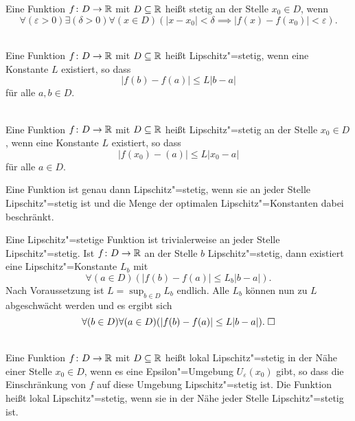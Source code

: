 \begin{Definition}\label{cont}
Eine Funktion $f\colon D\to\mathbb R$ mit $D\subseteq\mathbb R$ heißt stetig an der
Stelle $x_0\in D$, wenn
\[\forall(\varepsilon>0)\exists(\delta>0)\forall(x\in D)(
  |x-x_0|<\delta\implies |f(x)-f(x_0)|<\varepsilon).\]
\end{Definition}

\begin{Definition}\mbox{}\\
Eine Funktion $f\colon D\to\mathbb R$ mit $D\subseteq\mathbb R$ heißt
Lipschitz"=stetig, wenn eine Konstante $L$ existiert, so dass
\[|f(b)-f(a)|\le L|b-a|\]
für alle $a,b\in D$.
\end{Definition}

\begin{Definition}%
\label{Lipschitz-cont-at}\mbox{}\\
Eine Funktion $f\colon D\to\mathbb R$ mit $D\subseteq\mathbb R$ heißt
Lipschitz"=stetig an der Stelle $x_0\in D$, wenn eine Konstante $L$
existiert, so dass
\[|f(x_0)-(a)|\le L|x_0-a|\]
für alle $a\in D$.
\end{Definition}

\begin{Korollar}
Eine Funktion ist genau dann Lipschitz"=stetig, wenn sie an jeder
Stelle Lipschitz"=stetig ist und die Menge der optimalen
Lipschitz"=Konstanten dabei beschränkt.
\end{Korollar}
\begin{Beweis}
Eine Lipschitz"=stetige Funktion ist trivialerweise an jeder Stelle
Lipschitz"=stetig. Ist $f\colon D\to\mathbb R$ an der Stelle $b$ Lipschitz"=stetig,
dann existiert eine Lipschitz"=Konstante $L_b$ mit%
\[\forall(a\in D)(|f(b)-f(a)|\le L_b |b-a|).\]
Nach Voraussetzung ist $L=\sup_{b\in D} L_b$ endlich. Alle $L_b$ können
nun zu $L$ abgeschwächt werden und es ergibt sich%
\[\forall(b\in D)\forall(a\in D)(|f(b)-f(a)|\le L|b-a|).\;\square\]
\end{Beweis}


\begin{Definition}\mbox{}\\
Eine Funktion $f\colon D\to\mathbb R$ mit $D\subseteq\mathbb R$ heißt lokal
Lipschitz"=stetig in der Nähe einer Stelle $x_0\in D$, wenn es eine
Epsilon"=Umgebung $U_\varepsilon(x_0)$ gibt, so dass die Einschränkung
von $f$ auf diese Umgebung Lipschitz"=stetig ist. Die Funktion heißt
lokal Lipschitz"=stetig, wenn sie in der Nähe jeder Stelle
Lipschitz"=stetig ist.
\end{Definition}

